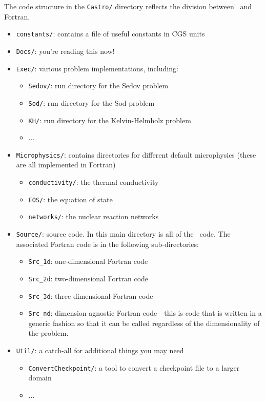The code structure in the {\tt Castro/} directory reflects the
division between \cpp\ and Fortran.
\begin{itemize}
\item {\tt constants/}: contains a file of useful constants in CGS units

\item {\tt Docs/}: you're reading this now!

\item {\tt Exec/}: various problem implementations, including:
  \begin{itemize}
  \item {\tt Sedov/}: run directory for the Sedov problem
  \item {\tt Sod/}: run directory for the Sod problem
  \item {\tt KH/}: run directory for the Kelvin-Helmholz problem
  \item $\ldots$
  \end{itemize}

\item {\tt Microphysics/}: contains directories for different default
  microphysics (these are all implemented in Fortran)
  \begin{itemize}
  \item {\tt conductivity/}: the thermal conductivity
  \item {\tt EOS/}: the equation of state
  \item {\tt networks/}: the nuclear reaction networks
  \end{itemize}

\item {\tt Source/}: source code.  In this main directory is all of
  the \cpp\ code.  The associated Fortran code is in the following
  sub-directories:
  \begin{itemize}
  \item {\tt Src\_1d}: one-dimensional Fortran code
  \item {\tt Src\_2d}: two-dimensional Fortran code
  \item {\tt Src\_3d}: three-dimensional Fortran code
  \item {\tt Src\_nd}: dimension agnostic Fortran code---this is code that
    is written in a generic fashion so that it can be called regardless
    of the dimensionality of the problem.
  \end{itemize}
\item {\tt Util/}: a catch-all for additional things you may need
  \begin{itemize}
  \item {\tt ConvertCheckpoint/}: a tool to convert a checkpoint file to
     a larger domain
  \item $\ldots$
  \end{itemize}


\end{itemize}


